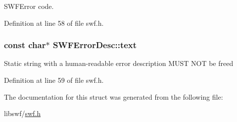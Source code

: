 S\+W\+F\+Error code. 



Definition at line 58 of file swf.\+h.

\hypertarget{struct_s_w_f_error_desc_ae8e679264f1fce07de9795638f760ca0}{}
\subsubsection[{text}]{\setlength{\rightskip}{0pt plus 5cm}const char$\ast$ S\+W\+F\+Error\+Desc\+::text}\label{struct_s_w_f_error_desc_ae8e679264f1fce07de9795638f760ca0}
Static string with a human-\/readable error description M\+U\+S\+T N\+O\+T be free\textquotesingle{}d 

Definition at line 59 of file swf.\+h.



The documentation for this struct was generated from the following file\+:\begin{DoxyCompactItemize}
\item 
libswf/\hyperlink{swf_8h}{swf.\+h}\end{DoxyCompactItemize}
